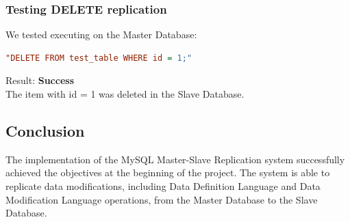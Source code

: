 \documentclass[a4paper,12pt]{report}
\begin{document}
\subsubsection{Testing DELETE replication }
We tested executing on the Master Database:
\begin{lstlisting}[language=ini, numbers=none]
"DELETE FROM test_table WHERE id = 1;"
\end{lstlisting}
Result: \textbf{Success}
\\
The item with id = 1 was deleted in the Slave Database.

\subsection{Conclusion}
The implementation of the MySQL Master-Slave Replication system successfully achieved the objectives at the beginning of the project. The system is able to replicate data modifications, including Data Definition Language and Data Modification Language operations, from the Master Database to the Slave Database.
\end{document}
